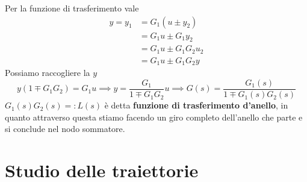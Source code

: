 Per la funzione di trasferimento vale
\begin{equation*}
	\begin{aligned}
		y=y_1 & =G_1\left(u\pm y_2\right) \\
		      & =G_1 u\pm G_1 y_2         \\
		      & =G_1 u\pm G_1 G_2 u_2     \\
		      & =G_1 u\pm G_1 G_2 y       
	\end{aligned}
\end{equation*}
Possiamo raccogliere la $y$
\begin{equation*}
	y\left(1\mp G_1 G_2\right) =G_1 u\implies y=\frac{G_1}{1\mp G_1 G_2} u\implies \boxed{G\left(s\right) =\frac{G_1\left(s\right)}{1\mp G_1\left(s\right) G_2\left(s\right)}}
\end{equation*}
$G_1(s)G_2(s)=:L(s)$ è detta \textbf{funzione di trasferimento d'anello}, in quanto attraverso questa stiamo facendo un giro completo dell'anello che parte e si conclude nel nodo sommatore.

\chapter{Studio delle traiettorie}


